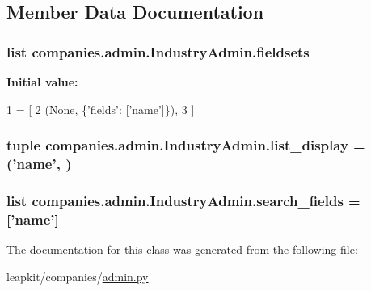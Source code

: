 \subsection{Member Data Documentation}
\hypertarget{classcompanies_1_1admin_1_1_industry_admin_add9f1424f3f77e0dd9fa544da998aca0}{
\subsubsection[{fieldsets}]{\setlength{\rightskip}{0pt plus 5cm}list companies.\-admin.\-Industry\-Admin.\-fieldsets\hspace{0.3cm}{\ttfamily [static]}}}\label{classcompanies_1_1admin_1_1_industry_admin_add9f1424f3f77e0dd9fa544da998aca0}
{\bfseries Initial value\-:}
\begin{DoxyCode}
1 = [
2         (\textcolor{keywordtype}{None}, \{\textcolor{stringliteral}{'fields'}: [\textcolor{stringliteral}{'name'}]\}),
3     ]
\end{DoxyCode}
\hypertarget{classcompanies_1_1admin_1_1_industry_admin_a0998ac15391f9f3f652ada6dcfe602df}{
\subsubsection[{list\-\_\-display}]{\setlength{\rightskip}{0pt plus 5cm}tuple companies.\-admin.\-Industry\-Admin.\-list\-\_\-display = ('name', )\hspace{0.3cm}{\ttfamily [static]}}}\label{classcompanies_1_1admin_1_1_industry_admin_a0998ac15391f9f3f652ada6dcfe602df}
\hypertarget{classcompanies_1_1admin_1_1_industry_admin_a2d8c3d6ebdcbe0b61859e786129f7553}{
\subsubsection[{search\-\_\-fields}]{\setlength{\rightskip}{0pt plus 5cm}list companies.\-admin.\-Industry\-Admin.\-search\-\_\-fields = \mbox{[}'name'\mbox{]}\hspace{0.3cm}{\ttfamily [static]}}}\label{classcompanies_1_1admin_1_1_industry_admin_a2d8c3d6ebdcbe0b61859e786129f7553}


The documentation for this class was generated from the following file\-:\begin{DoxyCompactItemize}
\item 
leapkit/companies/\hyperlink{companies_2admin_8py}{admin.\-py}\end{DoxyCompactItemize}
